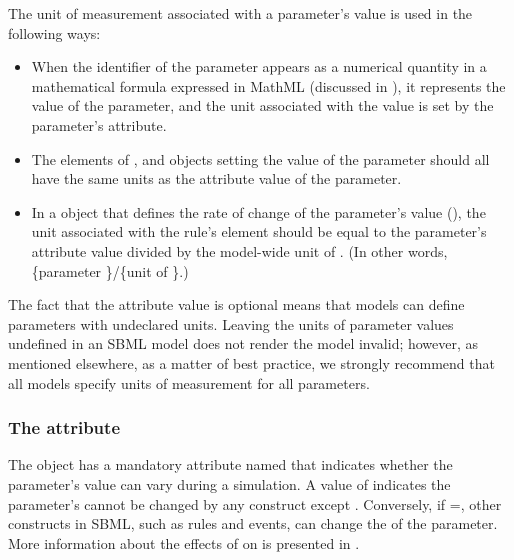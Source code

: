 The unit of measurement associated with a parameter's value is
used in the following ways:
\begin{itemize}

\item When the identifier of the parameter appears as a numerical
  quantity in a mathematical formula expressed in MathML
  (discussed in ), it represents the
  value of the parameter, and the unit associated with the value
  is set by the parameter's  attribute.

\item The  elements of \AssignmentRule,
  \InitialAssignment and \EventAssignment objects setting the
  value of the parameter should all have the same units as the
   attribute value of the parameter.

\item In a \RateRule object that defines the rate of change of the
  parameter's value (), the unit
  associated with the rule's  element should be equal
  to the parameter's  attribute value divided by the
  model-wide unit of .  (In other words,
  \{parameter \}/\{unit of \}.)

\end{itemize}

The fact that the  attribute value is optional means
that models can define parameters with undeclared units.  Leaving
the units of parameter values undefined in an SBML model does not
render the model invalid; however, as mentioned elsewhere, as a
matter of best practice, we strongly recommend that all models
specify units of measurement for all parameters.


\subsubsection{The  attribute}
\label{sec:parameter-constant}

The \Parameter object has a mandatory  attribute named
 that indicates whether the parameter's value can
vary during a simulation.  A value of  indicates the
parameter's  cannot be changed by any construct
except \InitialAssignment.  Conversely, if
=, other constructs in SBML, such as
rules and events, can change the  of the parameter.
More information about the effects of  on
 is presented in .


